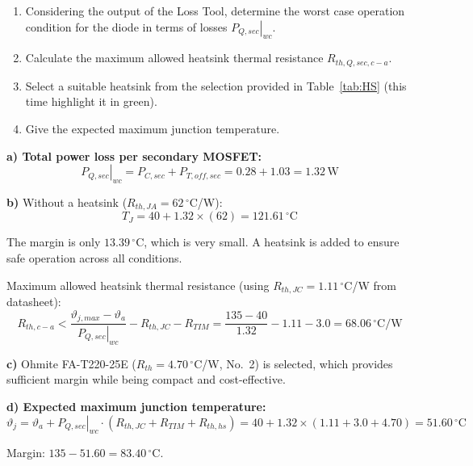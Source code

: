 \documentclass{PELsmallreport}
\begin{document}
\vspace{0.1em}
\begin{enumerate}[label=\alph*)]
	\item Considering the output of the Loss Tool, determine the worst case operation condition for the diode in terms of losses $\left.P_{Q,sec}\right|_{wc}$. 
	\item Calculate the maximum allowed heatsink thermal resistance $R_{th,Q,sec,c-a}$.
	\item Select a suitable heatsink from the selection provided in Table~\ref{tab:HS} (this time highlight it in \colorbox{green!20}{green}).
	\item Give the expected maximum junction temperature.
\end{enumerate}

\begin{framed}
	\vspace{2em}
  \textbf{a) Total power loss per secondary MOSFET:}
\begin{equation}
    \left.P_{Q,sec}\right|_{wc} = P_{C,sec} + P_{T,off,sec} = 0.28 + 1.03 = 1.32\,\text{W}
\end{equation}
 
\textbf{b)} Without a heatsink ($R_{th,JA} = 62\,^\circ$C/W):
\begin{equation}
    T_J = 40 + 1.32\times(62) = 121.61\,^\circ\text{C}
\end{equation}
 
The margin is only $13.39\,^\circ$C, which is very small. A heatsink is added to ensure safe operation across all conditions.
 
Maximum allowed heatsink thermal resistance (using $R_{th,JC} = 1.11\,^\circ$C/W from datasheet):
\begin{equation}
    R_{th,c-a} < \frac{\vartheta_{j,max} - \vartheta_a}{\left.P_{Q,sec}\right|_{wc}} - R_{th,JC} - R_{TIM}
    = \frac{135 - 40}{1.32} - 1.11 - 3.0 = 68.06\,^\circ\text{C/W}
\end{equation}
 
\textbf{c)} Ohmite FA-T220-25E ($R_{th} = 4.70\,^\circ$C/W, No.~2) is selected, which provides sufficient margin while being compact and cost-effective.
 
\textbf{d) Expected maximum junction temperature:}
\begin{equation}
    \vartheta_j = \vartheta_a + \left.P_{Q,sec}\right|_{wc}\cdot(R_{th,JC} + R_{TIM} + R_{th,hs})
    = 40 + 1.32\times(1.11 + 3.0 + 4.70) = 51.60\,^\circ\text{C}
\end{equation}
 
Margin: $135 - 51.60 = 83.40\,^\circ$C.
  \vspace{2em}
\end{framed}
\end{document}
